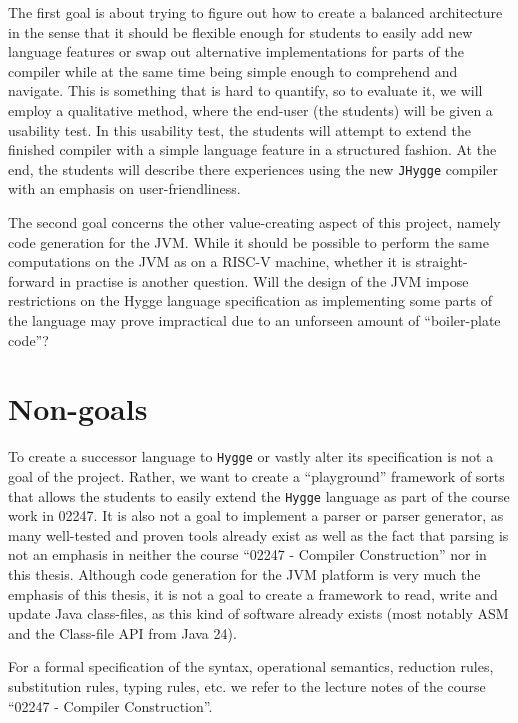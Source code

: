 The first goal is about trying to figure out how to create a balanced architecture in the sense that it should be flexible enough for students to easily add new language features or swap out alternative
implementations for parts of the compiler while at the same time being simple enough to comprehend and navigate. This is something that is hard to quantify, so to evaluate it, we will
employ a qualitative method, where the end-user (the students) will be given a usability test. In this usability test, the students will attempt to extend the finished compiler with
a simple language feature in a structured fashion. At the end, the students will describe there experiences using the new \texttt{JHygge} compiler with an emphasis on user-friendliness.

The second goal concerns the other value-creating aspect of this project, namely code generation for the JVM. While it should be possible to perform the same computations on the JVM
as on a RISC-V machine, whether it is straight-forward in practise is another question. Will the design of the JVM impose restrictions on the Hygge language specification as
implementing some parts of the language may prove impractical due to an unforseen amount of ``boiler-plate code''?

\section{Non-goals}

To create a successor language to \texttt{Hygge} or vastly alter its specification is not a goal of the project. Rather, we want to create a
``playground'' framework of sorts that allows the students to easily extend the \texttt{Hygge} language as part of the course work in 02247. 
It is also not a goal to implement a parser or parser generator, as many well-tested and proven tools already exist as well as the fact that
parsing is not an emphasis in neither the course ``02247 - Compiler Construction''\cite{curriculum_02247} nor in this thesis. Although code generation for the JVM platform
is very much the emphasis of this thesis, it is not a goal to create a framework to read, write and update Java class-files, as this kind of
software already exists (most notably ASM and the Class-file API\cite{jep484} from Java 24).

For a formal specification of the syntax, operational semantics, reduction rules, substitution rules, typing rules, etc. we refer to the lecture
notes of the course ``02247 - Compiler Construction''\cite{lecture_notes}.
